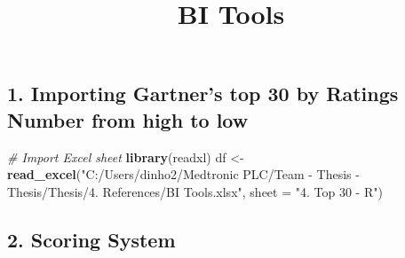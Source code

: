 \documentclass[
]{article}
\title{BI Tools}
\author{}
\date{\vspace{-2.5em}}
\newenvironment{Shaded}{\begin{snugshade}}{\end{snugshade}}
\newcommand{\AttributeTok}[1]{\textcolor[rgb]{0.13,0.29,0.53}{#1}}
\newcommand{\CommentTok}[1]{\textcolor[rgb]{0.56,0.35,0.01}{\textit{#1}}}
\newcommand{\FunctionTok}[1]{\textcolor[rgb]{0.13,0.29,0.53}{\textbf{#1}}}
\newcommand{\NormalTok}[1]{#1}
\newcommand{\OtherTok}[1]{\textcolor[rgb]{0.56,0.35,0.01}{#1}}
\newcommand{\StringTok}[1]{\textcolor[rgb]{0.31,0.60,0.02}{#1}}
\begin{document}
\maketitle

\subsection{1. Importing Gartner's top 30 by Ratings Number from high to
low}\label{importing-gartners-top-30-by-ratings-number-from-high-to-low}

\begin{Shaded}
\begin{Highlighting}[]
\CommentTok{\# Import Excel sheet}
\FunctionTok{library}\NormalTok{(readxl)}
\NormalTok{df }\OtherTok{\textless{}{-}} \FunctionTok{read\_excel}\NormalTok{(}\StringTok{"C:/Users/dinho2/Medtronic PLC/Team {-} Thesis {-} Thesis/Thesis/4. References/BI Tools.xlsx"}\NormalTok{, }
                 \AttributeTok{sheet =} \StringTok{"4. Top 30 {-} R"}\NormalTok{)}
\end{Highlighting}
\end{Shaded}

\subsection{2. Scoring System}\label{scoring-system}
\end{document}
